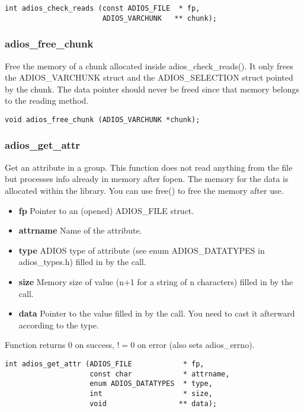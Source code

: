 \begin{lstlisting}[language=ADIOS]
int adios_check_reads (const ADIOS_FILE  * fp, 
                       ADIOS_VARCHUNK   ** chunk);
\end{lstlisting}

\subsubsection*{adios\_free\_chunk}
Free the memory of a chunk allocated inside adios\_check\_reads().
It only frees the ADIOS\_VARCHUNK struct and the ADIOS\_SELECTION struct
pointed by the chunk. The data pointer should never be freed since
that memory belongs to the reading method.

\begin{lstlisting}[language=ADIOS]
void adios_free_chunk (ADIOS_VARCHUNK *chunk);
\end{lstlisting}

\subsubsection*{adios\_get\_attr}
Get an attribute in a group.
This function does not read anything from the file but processes info
already in memory after fopen.
The memory for the data is allocated within the library.
You can use free() to free the memory after use.
\begin{itemize}
\item{\bf fp}       Pointer to an (opened) ADIOS\_FILE struct.
\item{\bf attrname} Name of the attribute.
\item{\bf type}    ADIOS type of attribute (see enum ADIOS\_DATATYPES in adios\_types.h) filled in by the call. 
\item{\bf size}     Memory size of value (n+1 for a string of n characters) filled in by the call. 
\item{\bf data}    Pointer to the value filled in by the call. You need to cast it afterward according to the type.
\end{itemize}

Function returns 0 on success, $!=0$ on error (also sets adios\_errno).

\begin{lstlisting}[language=ADIOS]
int adios_get_attr (ADIOS_FILE            * fp,
                    const char            * attrname,
                    enum ADIOS_DATATYPES  * type,
                    int                   * size,
                    void                 ** data);

\end{lstlisting}

